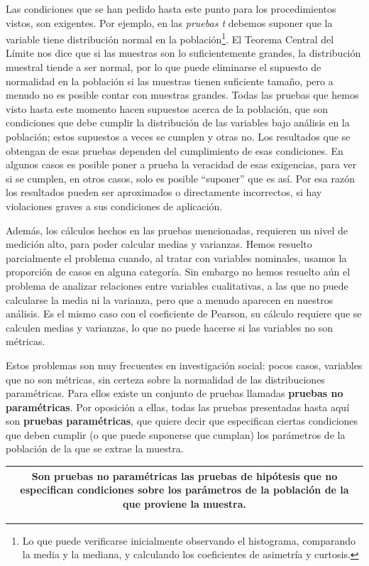 \documentclass[]{book}
\let\rmarkdownfootnote\footnote%
\def\footnote{\protect\rmarkdownfootnote}
\begin{document}
Las condiciones que se han pedido hasta este punto para los
procedimientos vistos, son exigentes. Por ejemplo, en las \emph{pruebas t}
debemos suponer que la variable tiene distribución normal en la
población\footnote{Lo que puede verificarse inicialmente observando el histograma, comparando la media y la mediana, y calculando los coeficientes de asimetría y curtosis.}. El Teorema Central del Límite nos dice que si las
muestras son lo suficientemente grandes, la distribución muestral tiende
a ser normal, por lo que puede eliminarse el supuesto de normalidad en
la población si las muestras tienen suficiente tamaño, pero a menudo no
es posible contar con muestras grandes. Todas las pruebas que hemos
visto hasta este momento hacen supuestos acerca de la población, que son
condiciones que debe cumplir la distribución de las variables bajo
análisis en la población; estos supuestos a veces se cumplen y otras no.
Los resultados que se obtengan de esas pruebas dependen del cumplimiento
de esas condiciones. En algunos casos es posible poner a prueba la
veracidad de esas exigencias, para ver si se cumplen, en otros casos,
solo es posible ``suponer'' que es así. Por esa razón los resultados
pueden ser aproximados o directamente incorrectos, si hay violaciones
graves a sus condiciones de aplicación.

Además, los cálculos hechos en las pruebas mencionadas, requieren un
nivel de medición alto, para poder calcular medias y varianzas. Hemos
resuelto parcialmente el problema cuando, al tratar con variables
nominales, usamos la proporción de casos en alguna categoría. Sin
embargo no hemos resuelto aún el problema de analizar relaciones entre
variables cualitativas, a las que no puede calcularse la media ni la
varianza, pero que a menudo aparecen en nuestros análisis. Es el mismo
caso con el coeficiente de Pearson, su cálculo requiere que se calculen
medias y varianzas, lo que no puede hacerse si las variables no son
métricas.

Estos problemas son muy frecuentes en investigación
social: pocos casos, variables que no son métricas, sin certeza sobre la
normalidad de las distribuciones paramétricas. Para ellos existe un conjunto de
pruebas llamadas \textbf{pruebas no paramétricas}. Por oposición a ellas,
todas las pruebas presentadas hasta aquí son \textbf{pruebas paramétricas},
que quiere decir que especifican ciertas condiciones que deben cumplir
(o que puede suponerse que cumplan) los parámetros de la población de la
que se extrae la muestra.

\begin{longtable}[]{@{}c@{}}
\toprule
\endhead
\begin{minipage}[t]{0.97\columnwidth}\centering
Son \textbf{pruebas no paramétricas} las pruebas de hipótesis que no especifican condiciones sobre los parámetros de la población de la que proviene la muestra.\strut
\end{minipage}\tabularnewline
\bottomrule
\end{longtable}
\end{document}
